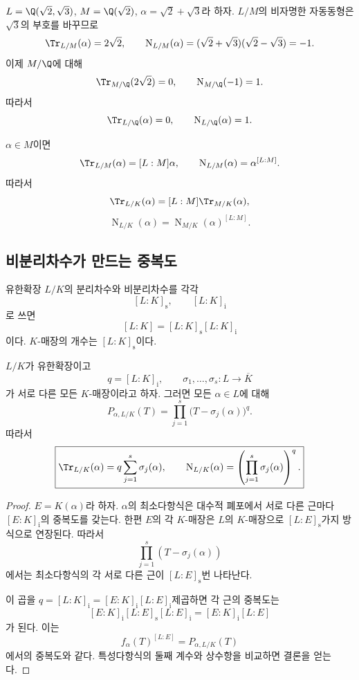 \begin{example}
$L=\Q(\sqrt2,\sqrt3)$, $M=\Q(\sqrt2)$, $\alpha=\sqrt2+\sqrt3$라 하자. $L/M$의 비자명한 자동동형은 $\sqrt3$의 부호를 바꾸므로
\[
  \Tr_{L/M}(\alpha)=2\sqrt2,
  \qquad
  \operatorname N_{L/M}(\alpha)
  =(\sqrt2+\sqrt3)(\sqrt2-\sqrt3)=-1.
\]
이제 $M/\Q$에 대해
\[
  \Tr_{M/\Q}(2\sqrt2)=0,
  \qquad
  \operatorname N_{M/\Q}(-1)=1.
\]
따라서
\[
  \Tr_{L/\Q}(\alpha)=0,
  \qquad
  \operatorname N_{L/\Q}(\alpha)=1.
\]
\end{example}

\begin{corollary}
$\alpha\in M$이면
\[
  \Tr_{L/M}(\alpha)=[L:M]\alpha,
  \qquad
  \operatorname N_{L/M}(\alpha)=\alpha^{[L:M]}.
\]
따라서
\[
  \Tr_{L/K}(\alpha)
  =[L:M]\Tr_{M/K}(\alpha),
\]
\[
  \operatorname N_{L/K}(\alpha)
  =\operatorname N_{M/K}(\alpha)^{[L:M]}.
\]
\end{corollary}

\subsection{비분리차수가 만드는 중복도}

유한확장 $L/K$의 분리차수와 비분리차수를 각각
\[
  [L:K]_{\mathrm s},
  \qquad
  [L:K]_{\mathrm i}
\]
로 쓰면
\[
  [L:K]=[L:K]_{\mathrm s}[L:K]_{\mathrm i}
\]
이다. $K$-매장의 개수는 $[L:K]_{\mathrm s}$이다.

\begin{theorem}
\label{thm:norm-trace-inseparable-embeddings}
$L/K$가 유한확장이고
\[
  q=[L:K]_{\mathrm i},
  \qquad
  \sigma_1,\dots,\sigma_s:L\longrightarrow\overline K
\]
가 서로 다른 모든 $K$-매장이라고 하자. 그러면 모든 $\alpha\in L$에 대해
\[
  \boxed{
  P_{\alpha,L/K}(T)
  =\prod_{j=1}^{s}
  \bigl(T-\sigma_j(\alpha)\bigr)^q.}
\]
따라서
\[
  \boxed{
  \Tr_{L/K}(\alpha)
  =q\sum_{j=1}^{s}\sigma_j(\alpha),
  \qquad
  \operatorname N_{L/K}(\alpha)
  =\left(\prod_{j=1}^{s}\sigma_j(\alpha)\right)^q.}
\]
\end{theorem}

\begin{proof}
$E=K(\alpha)$라 하자. $\alpha$의 최소다항식은 대수적 폐포에서 서로 다른 근마다 $[E:K]_{\mathrm i}$의 중복도를 갖는다. 한편 $E$의 각 $K$-매장은 $L$의 $K$-매장으로 $[L:E]_{\mathrm s}$가지 방식으로 연장된다. 따라서
\[
  \prod_{j=1}^{s}(T-\sigma_j(\alpha))
\]
에서는 최소다항식의 각 서로 다른 근이 $[L:E]_{\mathrm s}$번 나타난다.

이 곱을 $q=[L:K]_{\mathrm i}
=[E:K]_{\mathrm i}[L:E]_{\mathrm i}$제곱하면 각 근의 중복도는
\[
  [E:K]_{\mathrm i}[L:E]_{\mathrm s}[L:E]_{\mathrm i}
  =[E:K]_{\mathrm i}[L:E]
\]
가 된다. 이는
\[
  f_\alpha(T)^{[L:E]}
  =P_{\alpha,L/K}(T)
\]
에서의 중복도와 같다. 특성다항식의 둘째 계수와 상수항을 비교하면 결론을 얻는다.
\end{proof}

